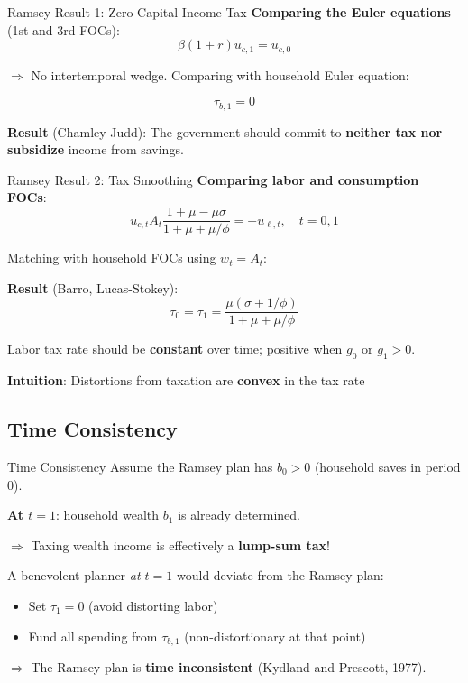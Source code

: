 \documentclass[blue]{beamer}
\begin{document}
\begin{frame}{Ramsey Result 1: Zero Capital Income Tax}
	\textbf{Comparing the Euler equations} (1st and 3rd FOCs):
	\[
{\beta(1+r) u_{c,1} = u_{c,0}}
	\]
	
	$\Rightarrow$ No intertemporal wedge. Comparing with household Euler equation:
	
	\[
{\tau_{b,1} = 0}
	\]
	
	\textbf{Result} (Chamley-Judd): The government should commit to \textbf{neither tax nor subsidize} income from savings.
\end{frame}

\begin{frame}{Ramsey Result 2: Tax Smoothing}
	\textbf{Comparing labor and consumption FOCs}:
	\[
	u_{c,t} A_t \frac{1+\mu-\mu\sigma}{1+\mu+\mu/\phi} = -u_{\ell,t}, \quad t = 0, 1
	\]
	
	Matching with household FOCs using $w_t = A_t$:
	
	\textbf{Result} (Barro, Lucas-Stokey):
	\[
	{\tau_0 = \tau_1 = \frac{\mu(\sigma + 1/\phi)}{1+\mu+\mu/\phi}}
	\]
	
	Labor tax rate should be \textbf{constant} over time; positive when $g_0$ or $g_1 > 0$. 
	
	\textbf{Intuition}: Distortions from taxation are \textbf{convex} in the tax rate
\end{frame}

\subsection{Time Consistency}

\begin{frame}{Time Consistency}
	Assume the Ramsey plan has $b_0 > 0$ (household saves in period 0).
	
	\bigskip
	\textbf{At $t = 1$}: household wealth $b_1$ is already determined.
	
	$\Rightarrow$ Taxing wealth income is effectively a \textbf{lump-sum tax}!
	
	\bigskip
	A benevolent planner \emph{at $t=1$} would deviate from the Ramsey plan:
	\begin{itemize}
		\item Set $\tau_1 = 0$ (avoid distorting labor)
		\item Fund all spending from $\tau_{b,1}$ (non-distortionary at that point)
	\end{itemize}
	
	$\Rightarrow$ The Ramsey plan is \textbf{time inconsistent} (Kydland and Prescott, 1977).
\end{frame}
\end{document}
